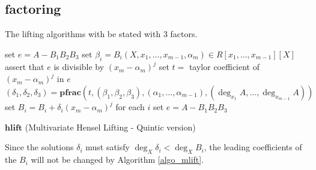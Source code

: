 \documentclass[11pt,reqno]{amsart}
\numberwithin{equation}{section}
\newcommand{\op}[1]  { \operatorname{ #1 }}
\begin{document}
\subsection{factoring}

The lifting algorithms with be stated with $3$ factors.


\begin{algorithm}[H]
\DontPrintSemicolon
{}

set $e = A - B_1 B_2 B_3$ 
set $\beta_i = B_i(X, x_1, \dots, x_{m-1}, \alpha_m) \in R[x_1, \dots, x_{m-1}][X]$\;
\For{$j=1$ \KwTo $\op{deg}_{x_m}(A)$}
{
	assert that $e$ is divisible by $(x_m - \alpha_m)^j$\;
	set $t =$ taylor coefficient of $(x_m - \alpha_m)^j$ in $e$ 
	$(\delta_1, \delta_2, \delta_3) = \textbf{pfrac}(t, (\beta_1, \beta_2, \beta_3),(\alpha_1, \dots,\alpha_{m-1}), (\op{deg}_{x_1}A, \dots, \op{deg}_{x_{m-1}}A))$ \;
	set $B_i = B_i + \delta_i (x_m - \alpha_m)^j$ for each $i$\;
	set $e = A - B_1 B_2 B_3$
}
{
}
\caption{$\textbf{hlift}$ (Multivariate Hensel Lifting - Quintic version)}
\label{algo_mlift}
\end{algorithm}

Since the solutions $\delta_i$ must satisfy $\op{deg}_{X} \delta_i < \op{deg}_{X} B_i$, the leading coefficients of the $B_i$ will not be changed by Algorithm \ref{algo_mlift}.
\end{document}

